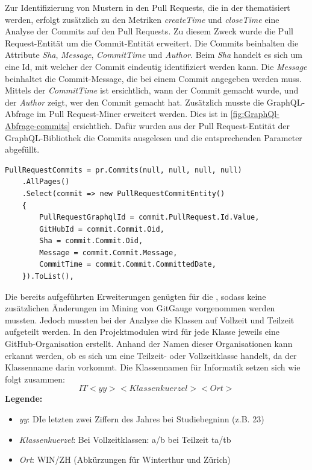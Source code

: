 Zur Identifizierung von Mustern in den Pull Requests, die in der  thematisiert werden, erfolgt zusätzlich zu den Metriken \textit{createTime} und \textit{closeTime} eine Analyse der Commits auf den Pull Requests. Zu diesem Zweck wurde die Pull Request-Entität um die Commit-Entität erweitert. Die Commits beinhalten die Attribute \textit{Sha}, \textit{Message}, \textit{CommitTime} und \textit{Author}. Beim \textit{Sha} handelt es sich um eine Id, mit welcher der Commit eindeutig identifiziert werden kann. Die \textit{Message} beinhaltet die Commit-Message, die bei einem Commit angegeben werden muss. Mittels der \textit{CommitTime} ist ersichtlich, wann der Commit gemacht wurde, und der \textit{Author} zeigt, wer den Commit gemacht hat. Zusätzlich musste die GraphQL-Abfrage im Pull Request-Miner erweitert werden. Dies ist in \autoref{fig:GraphQl-Abfrage-commits} ersichtlich. Dafür wurden aus der Pull Request-Entität der GraphQL-Bibliothek die Commits ausgelesen und die entsprechenden Parameter abgefüllt.
\begin{lstlisting}[language=CSharp, caption={GraphQL-Abfrage Pull Request Commits}, label={lst:graphql-commits}]
PullRequestCommits = pr.Commits(null, null, null, null)
    .AllPages()
    .Select(commit => new PullRequestCommitEntity()
    {
        PullRequestGraphqlId = commit.PullRequest.Id.Value,
        GitHubId = commit.Commit.Oid,
        Sha = commit.Commit.Oid,
        Message = commit.Commit.Message,
        CommitTime = commit.Commit.CommittedDate,
    }).ToList(),
\end{lstlisting}

\newpage
Die bereits aufgeführten Erweiterungen genügten für die , sodass keine zusätzlichen Änderungen im Mining von GitGauge vorgenommen werden mussten. Jedoch mussten bei der Analyse die Klassen auf Vollzeit und Teilzeit aufgeteilt werden. In den Projektmodulen wird für jede Klasse jeweils eine GitHub-Organisation erstellt. Anhand der Namen dieser Organisationen kann erkannt werden, ob es sich um eine Teilzeit- oder Vollzeitklasse handelt, da der Klassenname darin vorkommt. Die Klassennamen für Informatik setzen sich wie folgt zusammen: 
\begin{equation}
IT<yy><Klassenkuerzel><Ort>
\end{equation}
\noindent\textbf{Legende:}
\begin{itemize}
  \item \textit{yy}:  DIe letzten zwei Ziffern des Jahres bei Studiebegninn (z.B. 23)
  \item\textit{Klassenkuerzel}: Bei Vollzeitklassen: a/b bei Teilzeit ta/tb
  \item\textit{Ort}: WIN/ZH (Abkürzungen für Winterthur und Zürich)
\end{itemize}

